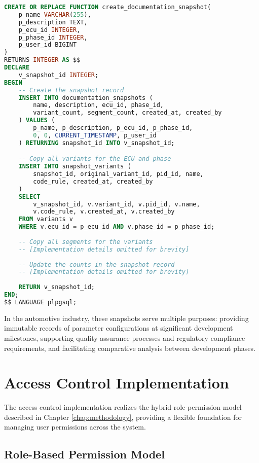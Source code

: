 \begin{lstlisting}[language=SQL, caption={Documentation Snapshot Function}, label={lst:documentation-snapshot-function}]
CREATE OR REPLACE FUNCTION create_documentation_snapshot(
    p_name VARCHAR(255),
    p_description TEXT,
    p_ecu_id INTEGER,
    p_phase_id INTEGER,
    p_user_id BIGINT
)
RETURNS INTEGER AS $$
DECLARE
    v_snapshot_id INTEGER;
BEGIN
    -- Create the snapshot record
    INSERT INTO documentation_snapshots (
        name, description, ecu_id, phase_id,
        variant_count, segment_count, created_at, created_by
    ) VALUES (
        p_name, p_description, p_ecu_id, p_phase_id,
        0, 0, CURRENT_TIMESTAMP, p_user_id
    ) RETURNING snapshot_id INTO v_snapshot_id;

    -- Copy all variants for the ECU and phase
    INSERT INTO snapshot_variants (
        snapshot_id, original_variant_id, pid_id, name,
        code_rule, created_at, created_by
    )
    SELECT 
        v_snapshot_id, v.variant_id, v.pid_id, v.name,
        v.code_rule, v.created_at, v.created_by
    FROM variants v
    WHERE v.ecu_id = p_ecu_id AND v.phase_id = p_phase_id;
    
    -- Copy all segments for the variants
    -- [Implementation details omitted for brevity]
    
    -- Update the counts in the snapshot record
    -- [Implementation details omitted for brevity]
    
    RETURN v_snapshot_id;
END;
$$ LANGUAGE plpgsql;
\end{lstlisting}

In the automotive industry, these snapshots serve multiple purposes: providing immutable records of parameter configurations at significant development milestones, supporting quality assurance processes and regulatory compliance requirements, and facilitating comparative analysis between development phases.

\section{Access Control Implementation}
\label{sec:access-control-implementation}

The access control implementation realizes the hybrid role-permission model described in Chapter \ref{chap:methodology}, providing a flexible foundation for managing user permissions across the system.

\subsection{Role-Based Permission Model}
\label{subsec:role-based-permission-model}

